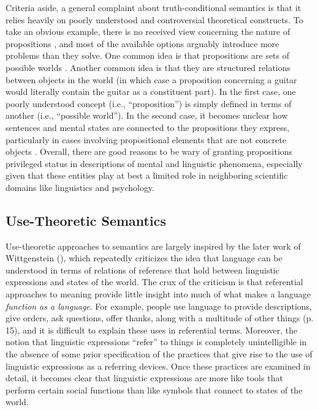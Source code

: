 Criteria aside, a general complaint about truth-conditional semantics is that it relies heavily on poorly understood and controversial theoretical constructs. To take an obvious example, there is no received view concerning the nature of propositions \citep{Speaks:2014,Soames:2010,Dennett:1987}, and most of the available options arguably introduce more problems than they solve. One common idea is that propositions are sets of possible worlds \citep{Speaks:2014}. Another common idea is that they are structured relations between objects in the world (in which case a proposition concerning a guitar would literally contain the guitar as a constituent part)\citep{Soames:2010}. In the first case, one poorly understood concept (i.e., ``proposition'') is simply defined in terms of another (i.e., ``possible world''). In the second case, it becomes unclear how sentences and mental states are connected to the propositions they express, particularly in cases involving propositional elements that are not concrete objects \citep{Speaks:2014}. Overall, there are good reasons to be wary of granting propositions privileged status in descriptions of mental and linguistic phenomena, especially given that these entities play at best a limited role in neighboring scientific domains like linguistics and psychology.
 
\subsection{Use-Theoretic Semantics}

Use-theoretic approaches to semantics are largely inspired by the later work of Wittgenstein (\citeyear{Wittgenstein:1953}), which repeatedly criticizes the idea that language can be understood in terms of relations of reference that hold between linguistic expressions and states of the world. The crux of the criticism is that referential approaches to meaning provide little insight into much of what makes a language \textit{function as a language}. For example, people use language to provide descriptions, give orders, ask questions, offer thanks, along with a multitude of other things (p. 15), and it is difficult to explain these uses in referential terms. Moreover, the notion that linguistic expressions ``refer'' to things is completely unintelligible in the absence of some prior specification of the practices that give rise to the use of linguistic expressions as a referring devices. Once these practices are examined in detail, it becomes clear that linguistic expressions are more like tools that perform certain social functions than like symbols that connect to states of the world. 

